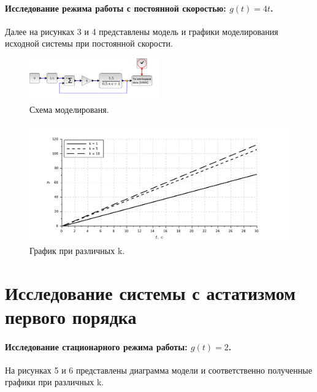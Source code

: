 \documentclass[a4paper, 11pt]{article}
\begin{document}
\paragraph{Исследование режима работы с постоянной скоростью: $g(t) = 4t$.}
Далее на рисунках 3 и 4 представлены модель и графики моделирования исходной системы при постоянной скорости.
\begin{figure}[h!]
    \centering
    \includegraphics[width = 0.5\textwidth]{images/model1-2.pdf}
    \caption{Схема моделированя.}
\end{figure}
\begin{figure}[h!]
    \centering
    \includegraphics[width = \textwidth]{images/graph1-2.pdf}
    \caption{График при различных k.}
\end{figure}

\newpage
\section*{Исследование системы с астатизмом первого порядка}
\paragraph{Исследование стационарного режима работы: $g(t) = 2$.} На рисунках 5 и 6 представлены диаграмма модели и соответственно полученные графики при различных k.
\end{document}
